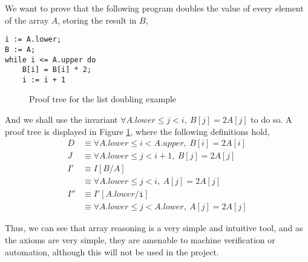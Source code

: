 \begin{example}
  \label{exmpl:heap-double}

  We want to prove that the following program doubles the value of
  every element of the array $A$, storing the result in $B$,
\pagebreak
\begin{lstlisting}
i := A.lower;
B := A;
while i <= A.upper do
    B[i] = B[i] * 2;
    i := i + 1
\end{lstlisting}

  \begin{figure}[t]
    \centering
    \begin{prooftree}




    \end{prooftree}
    \caption{Proof tree for the list doubling example}
    \label{fig:exmpl:heap-double-tree}
  \end{figure}

  And we shall use the invariant $\forall A.lower \leq j < i,\ B[j]
  = 2 A[j]$ to do so. A proof tree is displayed in Figure
  \ref{fig:exmpl:heap-double-tree}, where the following definitions hold,
  \begin{align*}
    D &\equiv \forall A.lower \leq i < A.upper,\ B[i] = 2 A[i]\\
    J &\equiv \forall A.lower \leq j < i + 1,\ B[j] = 2 A[j]\\
    I' &\equiv I[B/A]\\
    &\equiv \forall A.lower \leq j < i,\ A[j] = 2 A[j]\\
    I'' &\equiv I'[A.lower/\mathtt{i}]\\
    &\equiv \forall A.lower \leq j < A.lower,\ A[j] = 2 A[j]
  \end{align*}
\end{example}

Thus, we can see that array reasoning is a very simple and intuitive
tool, and as the axioms are very simple, they are amenable to machine
verification or automation, although this will not be used in the project.

